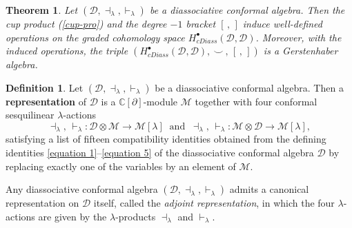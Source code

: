 \documentclass[a4paper,reqno,10pt]{amsart}
\theoremstyle{plain}
\newtheorem{theorem}[thm]{Theorem}
\theoremstyle{definition}
\newtheorem{definition}[thm]{Definition}
\theoremstyle{remark}
\newcommand{\C}{\mathbb{C}}
\newcommand{\D}{\mathcal{D}}
\newcommand{\M}{\mathcal{M}}
\newcommand{\p}{\partial}
\newcommand{\la}{\lambda}
\begin{document}
\begin{theorem}\label{thm-gers}
Let $(\D,\dashv_{\la},\vdash_{\la})$ be a diassociative conformal algebra. Then the cup product (\ref{cup-pro}) and the degree $-1$ bracket $[\, ,\, ]$ induce well-defined operations on the graded cohomology space $H_{cDiass}^{\bullet}(\D,\D)
$. Moreover, with the induced operations, the triple $\left(H_{cDiass}^{\bullet}(\D,\D), ~ \! \smile ~ \! ,\,[\, ,\, ]\right)$ is a Gerstenhaber algebra.
\end{theorem}

\medskip



 \begin{definition}
Let $(\D,\dashv_{\la},\vdash_{\la})$ be a diassociative conformal algebra. Then a  {\bf representation} of $\D$ is a $\C[\partial]$-module $\M$ together with four conformal sesquilinear $\la$-actions
\[
\dashv_{\la},\,\vdash_{\la}:\D\otimes\M\longrightarrow\M[\la] ~ \text{ and } ~
\dashv_{\la},\,\vdash_{\la}:\M\otimes\D\longrightarrow\M[\la],
\]
satisfying a list of fifteen compatibility identities obtained from the defining identities \eqref{equation 1}--\eqref{equation 5} of the diassociative conformal algebra $\D$ by replacing exactly one of the variables by an element of $\M$. 
\end{definition}


Any diassociative conformal algebra $(\D, \dashv_\la, \vdash_\la)$ admits a canonical representation on $\D$ itself, called the \emph{adjoint representation}, in which the four $\la$-actions are given by the $\la$-products $\dashv_{\la}$ and $\vdash_{\la}$.
\end{document}

